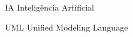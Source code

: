 ﻿%
\begin{siglas}
 \item IA Inteligência Artificial
 \item UML Unified Modeling Language
\end{siglas}





